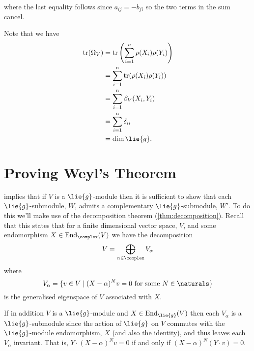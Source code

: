 \documentclass[fleqn]{NotesClass}
\DeclareMathOperator{\End}{End}
\DeclareMathOperator{\tr}{tr}
\begin{document}
    where the last equality follows since \(a_{ij} = -b_{ji}\) so the two terms in the sum cancel.
    
    Note that we have
    \begin{align}
        \tr(\Omega_V) &= \tr\left( \sum_{i=1}^n \rho(X_i)\rho(Y_i) \right)\\
        &= \sum_{i=1}^n \tr(\rho(X_i)\rho(Y_i))\\
        &= \sum_{i=1}^n \beta_V(X_i, Y_i)\\
        &= \sum_{i=1}^n \delta_{ii}\\
        &= \dim \lie{g}.
    \end{align}
    
    \section{Proving Weyl's Theorem}
     implies that if \(V\) is a \(\lie{g}\)-module then it is sufficient to show that each \(\lie{g}\)-submodule, \(W\), admits a complementary \(\lie{g}\)-submodule, \(W'\).
    To do this we'll make use of the decomposition theorem (\cref{thm:decomposition}).
    Recall that this states that for a finite dimensional vector space, \(V\), and some endomorphism \(X \in \End_{\complex}(V)\) we have the decomposition
    \begin{equation}
        V = \bigoplus_{\alpha \in \complex} V_\alpha
    \end{equation}
    where
    \begin{equation}
        V_\alpha = \{v \in V \mid (X - \alpha)^Nv = 0 \text{ for some } N \in \naturals\}
    \end{equation}
    is the generalised eigenspace of \(V\) associated with \(X\).
    
    If in addition \(V\) is a \(\lie{g}\)-module and \(X \in \End_{\lie{g}}(V)\) then each \(V_\alpha\) is a \(\lie{g}\)-submodule since the action of \(\lie{g}\) on \(V\) commutes with the \(\lie{g}\)-module endomorphism, \(X\) (and also the identity), and thus leaves each \(V_\alpha\) invariant.
    That is, \(Y \cdot (X - \alpha)^Nv = 0\) if and only if \((X - \alpha)^N(Y \cdot v) = 0\).
    
\end{document}
